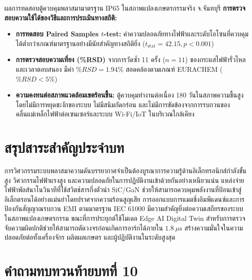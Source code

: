 \begin{agribox}{ผลการทดสอบตู้ควบคุมพลาสมามาตรฐาน IP65 ในสภาพแปลงเกษตรกรรมจริง จ.จันทบุรี}
\textbf{การตรวจสอบความใช้ได้ของวิธีและการประเมินทางสถิติ:}
\begin{itemize}
    \item \textbf{การทดสอบ Paired Samples $t$-test:} ค่าความปลอดภัยทางไฟฟ้าและระดับโอโซนที่ควบคุมได้ต่ำกว่าเกณฑ์มาตรฐานอย่างมีนัยสำคัญทางสถิติยิ่ง ($t_{\text{stat}} = 42.15, p < 0.001$)
    \item \textbf{การตรวจสอบความเที่ยง (\%RSD)} จากการวัดซ้ำ 11 ครั้ง ($n=11$) ของกระแสไฟฟ้ารั่วไหลและเวลาตอบสนอง มีค่า $\%RSD = 1.94\%$ สอดคล้องตามเกณฑ์ EURACHEM ($\%RSD < 5\%$)
    \item \textbf{ความคงทนต่อสภาพแวดล้อมเขตร้อนชื้น:} ตู้ควบคุมทำงานต่อเนื่อง 180 วันในสภาพความชื้นสูงโดยไม่มีการหยุดชะงักของระบบ ไม่มีสนิมกัดกร่อน และไม่มีการขัดข้องจากการรบกวนของคลื่นแม่เหล็กไฟฟ้าต่อเซนเซอร์และระบบ Wi-Fi/IoT ในบริเวณใกล้เคียง
\end{itemize}
\end{agribox}

\section{สรุปสาระสำคัญประจำบท}

การวิศวกรรมระบบพลาสมาความดันบรรยากาศจำเป็นต้องบูรณาการความรู้ด้านอิเล็กทรอนิกส์กำลังขั้นสูง วิศวกรรมไฟฟ้าแรงสูง และความปลอดภัยในการปฏิบัติงานเข้าด้วยกันอย่างเหนียวแน่น แหล่งจ่ายไฟฟ้าพัลส์นาโนวินาทีที่ใช้สวิตช์สารกึ่งตัวนำ SiC/GaN ช่วยให้สามารถควบคุมพลังงานที่ป้อนเข้าสู่อิเล็กตรอนได้อย่างแม่นยำโดยปราศจากความร้อนสูญเสีย การออกแบบการแมตชิ่งอิมพีแดนซ์และการป้องกันสัญญาณรบกวน EMI ตามมาตรฐาน IEC 61000 มีความสำคัญยิ่งต่อความเสถียรของระบบในสภาพแปลงเกษตรกรรม ขณะที่การประยุกต์ใช้โมเดล Edge AI Digital Twin สำหรับการตรวจจับความผิดปกติช่วยให้สามารถตัดวงจรก่อนเกิดการอาร์กได้ภายใน $1.8 \ \mu\text{s}$ สร้างความมั่นใจในความปลอดภัยต่อทั้งเครื่องจักร ผลิตผลเกษตร และผู้ปฏิบัติงานในระดับสูงสุด

\section{คำถามทบทวนท้ายบทที่ 10}

